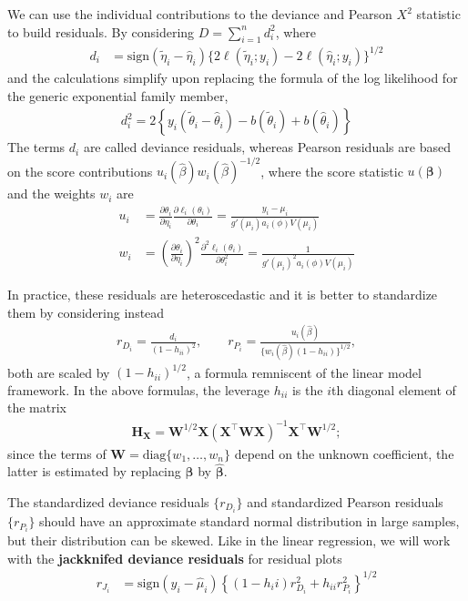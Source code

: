 \documentclass[
  11pt,
  letterpaper,
]{book}
\theoremstyle{definition}
\theoremstyle{definition}
\theoremstyle{definition}
\theoremstyle{remark}
\begin{document}
We can use the individual contributions to the deviance and Pearson
\(X^2\) statistic to build residuals. By considering
\(D = \sum_{i=1}^n d_i^2\), where
\begin{align*}
d_i &= \mathrm{sign}(\widetilde{\eta}_i - \widehat{\eta}_i) \{2\ell(\widetilde{\eta}_i; y_i) - 2\ell(\widehat{\eta}_i; y_i)\}^{1/2}
\end{align*}
and the calculations simplify upon replacing the formula of
the log likelihood for the generic exponential family member,
\begin{align*}
d_i^2=2 \left\{y_i (\widetilde{\theta}_i - \widehat{\theta}_i) - b(\widetilde{\theta}_i) + b(\widehat{\theta}_i)\right\}
\end{align*}
The terms \(d_i\) are called deviance residuals, whereas
Pearson residuals are based on the score contributions
\(u_i(\widehat{\beta}) w_i(\widehat{\beta})^{-1/2}\), where the score statistic \(u(\boldsymbol{\beta})\) and the weights \(w_i\) are
\begin{align*}
u_i &= \frac{\partial \theta_i}{\partial \eta_i} \frac{\partial \ell_i(\theta_i)}{\partial \theta_i} = \frac{y_i - \mu_i}{g'(\mu_i)a_i(\phi)V(\mu_i)}\\
w_i &= \left(\frac{\partial \theta_i}{\partial \eta_i}\right)^2 \frac{\partial^2 \ell_i(\theta_i)}{\partial \theta_i^2} = \frac{1}{g'(\mu_i)^2 a_i(\phi)V(\mu_i)}
\end{align*}

In practice, these residuals are heteroscedastic and it is better to
standardize them by considering instead
\begin{align*}
r_{D_i} = \frac{d_i}{(1-h_{ii})^2}, \qquad r_{P_i} = \frac{u_i(\widehat{\beta})}{\{w_i(\widehat{\beta})(1-h_{ii})\}^{1/2}},
\end{align*}
both are scaled by \((1-h_{ii})^{1/2}\), a formula remniscent
of the linear model framework. In the above formulas, the leverage
\(h_{ii}\) is the \(i\)th diagonal element of the matrix \begin{align*}
\mathbf{H}_{\mathbf{X}} = \mathbf{W}^{1/2}\mathbf{X}(\mathbf{X}^\top\mathbf{W}\mathbf{X})^{-1} \mathbf{X}^\top\mathbf{W}^{1/2};
\end{align*}
since the terms of
\(\mathbf{W}=\mathrm{diag}\{w_1, \ldots, w_n\}\) depend on the unknown
coefficient, the latter is estimated by replacing \(\boldsymbol{\beta}\)
by \(\widehat{\boldsymbol{\beta}}\).

The standardized deviance residuals \(\{r_{D_i}\}\) and standardized
Pearson residuals \(\{r_{P_i}\}\) should have an approximate standard
normal distribution in large samples, but their distribution can be
skewed. Like in the linear regression, we will work with the
\textbf{jackknifed deviance residuals} for residual plots \begin{align*}
r_{J_i} &= \mathrm{sign}(y_i - \widehat{\mu}_i) \left\{ (1-{h_ii})r^2_{D_i} + h_{ii}r^2_{P_i}\right\}^{1/2}
\end{align*}
\end{document}
